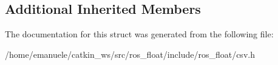 \subsection*{Additional Inherited Members}


The documentation for this struct was generated from the following file\+:\begin{DoxyCompactItemize}
\item 
/home/emanuele/catkin\+\_\+ws/src/ros\+\_\+float/include/ros\+\_\+float/csv.\+h\end{DoxyCompactItemize}
